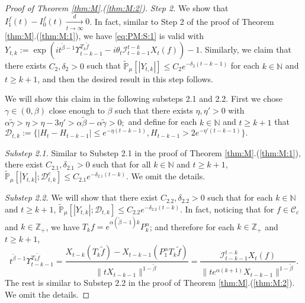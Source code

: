 \documentclass[12pt,a4paper]{amsart}
\theoremstyle{plain}
\theoremstyle{definition}
\numberwithin{equation}{section}
\begin{document}
\begin{proof}[Proof of Theorem \ref{thm:M}.(\ref{thm:M:2})]
  \emph{Step 2.} We show that $ I^f_1(t) - I^f_0 (t) \xrightarrow[t\to \infty]{d} 0$.
In fact, similar to Step 2 of the proof of Theorem \ref{thm:M}.(\ref{thm:M:1}), we  have \eqref{eq:PM:S:1} is valid with
\(
    Y_{t,k}
    := \exp(i t^{\tilde \beta - 1} \Upsilon_{t-k-1}^{T_{k}\tilde f} - i\theta_t \mathcal I_{t-k-1}^{t-k} X_t(f)) - 1.
\)
Similarly, we claim that there exists $C_2, \delta_2>0$ such that \(\widetilde {\mathbb P}_\mu [|Y_{t,k}|] \leq C_2 e^{-\delta_2 (t-k-1)}\) for each $k\in \mathbb N$ and $t\geq k+1$, and  then the desired result in this step follows.

We  will  show this claim in the following substeps 2.1 and 2.2.
  First we chose $\gamma \in (0,\beta)$ close enough to $\beta$ such that there exists $\eta,\eta'>0$ with
  \(
    \alpha \tilde \gamma
    >\eta
    > \eta - 3\eta'
    > \alpha \tilde \beta - \alpha \tilde \gamma
    > 0;
  \)
  and define for each $k \in \mathbb N$ and $t\geq k+1$ that
\(
\mathcal{D}_{t,k}
    :=\{|H_t-H_{t-k-1}|\leq  e^{-\eta (t-k-1)}, H_{t-k-1}> 2e^{-\eta' (t-k-1)}\}.
\)

  \emph{Substep 2.1.}
  Similar to Substep 2.1 in the proof of Theorem \ref{thm:M}.(\ref{thm:M:1}), there exist $C_{2.1},\delta_{2.1} >0$ such that for all $k \in \mathbb N$ and $t\geq k+1$,
  \(
    \mathbb{\widetilde{P}}_{\mu}[|Y_{t,k}|;\mathcal{D}^c_{t,k}]
    \leq C_{2.1} e^{-\delta_{2.1} (t-k)}.
  \)
  We omit the details.

  \emph{Substep 2.2.} We will show that there exist $C_{2.2},\delta_{2.2} > 0$ such that for each $k\in \mathbb N$ and $t\geq k+1$,
\(
\mathbb{\widetilde{P}}_{\mu}[|Y_{t,k}|;\mathcal{D}_{t,k}]
    \leq  C_{2.2} e^{-\delta_{2.2} (t-k)}.
\)
In fact, noticing that for $f\in \mathcal C_c$ and $k\in \mathbb Z_+$, we have $T_kf = e^{\alpha (\tilde \beta - 1 )k}P_k^\alpha $; and therefore for each $k\in \mathbb Z_+$ and $t \geq k + 1$,
  \[
    t^{\tilde \beta - 1} \Upsilon_{t-k-1}^{T_{k} \tilde f}
    = \frac{X_{t-k}(T_{k} \tilde f) - X_{t -k-1}(P_1^\alpha T_{k} \tilde f)}{\|t X_{t-k-1}\|^{1-\tilde \beta}}
    = \frac{\mathcal I_{t - k - 1}^{t - k} X_t(f)}{\|te^{\alpha (k+1)}X_{t-k-1} \|^{1 -\tilde \beta}}.
  \]
The rest is similar to Substep 2.2 in the proof of Theorem \ref{thm:M}.(\ref{thm:M:2}).
  We omit the details.


\end{proof}
\end{document}
